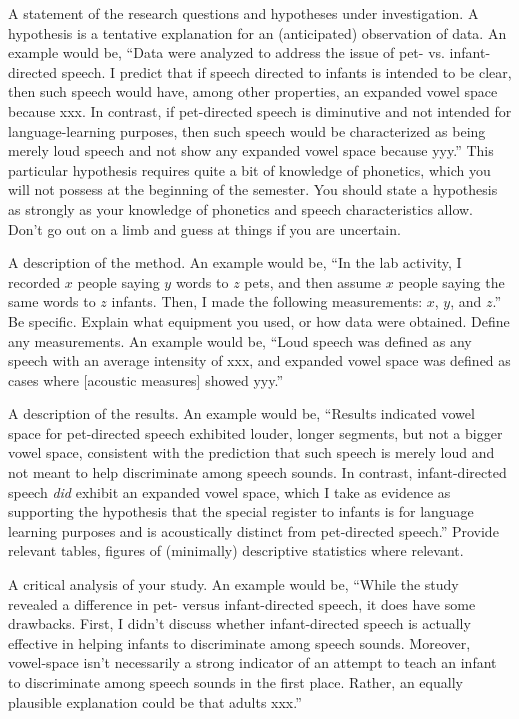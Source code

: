 \documentclass[lab={2},title={Voice Onset Time}]{com310lab}
\begin{document}
\begin{hypothesis}
	A statement of the research questions and hypotheses under investigation.
	A hypothesis is a tentative explanation for an (anticipated) observation of data.
	An example would be, ``Data were analyzed to address the issue of pet- vs. infant-directed speech.
	I predict that if speech directed to infants is intended to be clear, then such speech would have, among other properties, an expanded vowel space because xxx.
	In contrast, if pet-directed speech is diminutive and not intended for language-learning purposes, then such speech would be characterized as being merely loud speech and not show any expanded vowel space because yyy.''
	This particular hypothesis requires quite a bit of knowledge of phonetics, which you will not possess at the beginning of the semester.
	You should state a hypothesis as strongly as your knowledge of phonetics and speech characteristics allow.
	Don't go out on a limb and guess at things if you are uncertain.
\end{hypothesis}

\begin{method}
	A description of the method.
	An example would be,
	``In the lab activity, I recorded $x$ people saying $y$ words to $z$ pets, and then assume $x$ people saying the same words to $z$ infants.
	Then, I made the following measurements: $x$, $y$, and $z$.''
	Be specific.
	Explain what equipment you used, or how data were obtained.
	Define any measurements.
	An example would be,
	``Loud speech was defined as any speech with an average intensity of xxx, and expanded vowel space was defined as cases where [acoustic measures] showed yyy.''
\end{method}

\begin{results}
	A description of the results.
	An example would be,
	``Results indicated vowel space for pet-directed speech exhibited louder, longer segments, but not a bigger vowel space, consistent with the prediction that such speech is merely loud and not meant to help discriminate among speech sounds.
	In contrast, infant-directed speech \textit{did} exhibit an expanded vowel space, which I take as evidence as supporting the hypothesis that the special register to infants is for language learning purposes and is acoustically distinct from pet-directed speech.''
	Provide relevant tables, figures of (minimally) descriptive statistics where relevant.\\
\end{results}

\begin{discussion}
	A critical analysis of your study.
	An example would be,
	``While the study revealed a difference in pet- versus infant-directed speech, it does have some drawbacks.
	First, I didn't discuss whether infant-directed speech is actually effective in helping infants to discriminate among speech sounds.
	Moreover, vowel-space isn't necessarily a strong indicator of an attempt to teach an infant to discriminate among speech sounds in the first place.
	Rather, an equally plausible explanation could be that adults xxx.''
\end{discussion}
\end{document}
